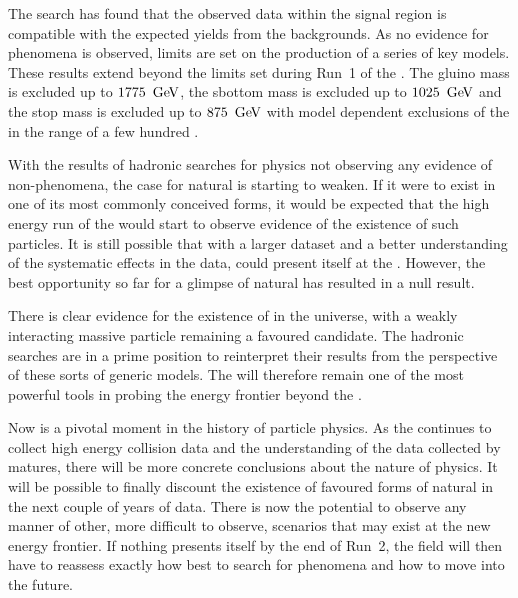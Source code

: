 The search has found that the observed data within the signal region
is compatible with the expected yields from the \SM backgrounds. As no
evidence for \BSM phenomena is observed, limits are set on the
production of a series of key \SUSY models. These results extend
beyond the limits set during Run~1 of the \LHC. The gluino mass is
excluded up to $1775~\mathrm{\,Ge\kern -0.1em V}$, the sbottom mass is excluded up to
$1025~\mathrm{\,Ge\kern -0.1em V}$ and the stop mass is excluded up to $875~\mathrm{\,Ge\kern -0.1em V}$ with model
dependent exclusions of the \LSP in the range of a few hundred \gev.

With the results of hadronic searches for \BSM physics not observing
any evidence of non-\SM phenomena, the case for natural \SUSY is
starting to weaken. If it were to exist in one of its most commonly
conceived forms, it would be expected that the high energy run of the
\LHC would start to observe evidence of the existence of such \SUSY
particles. It is still possible that with a larger dataset and a
better understanding of the systematic effects in the data, \SUSY could present
itself at the \LHC. However, the best opportunity so far for a glimpse of
natural \SUSY has resulted in a null result. 

There is clear evidence for the existence of \DM in the universe, with
a weakly interacting massive particle remaining a favoured candidate.
The hadronic \SUSY searches are in a prime position to reinterpret
their results from the perspective of these sorts of generic \DM
models. The \LHC will therefore remain one of the most powerful tools
in probing the energy frontier beyond the \SM.

Now is a pivotal moment in the history of particle physics. As the
\LHC continues to collect high energy collision data and the
understanding of the data collected by \CMS matures, there will be
more concrete conclusions about the nature of \BSM physics.  It will
be possible to finally discount the existence of favoured forms of
natural \SUSY in the next couple of years of \LHC data. There is now
the potential to observe any manner of other, more difficult to observe,
\BSM scenarios that may exist at the new energy frontier. If nothing
presents itself by the end of Run~2, the field will then have to
reassess exactly how best to search for \BSM phenomena and how to move
into the future.

